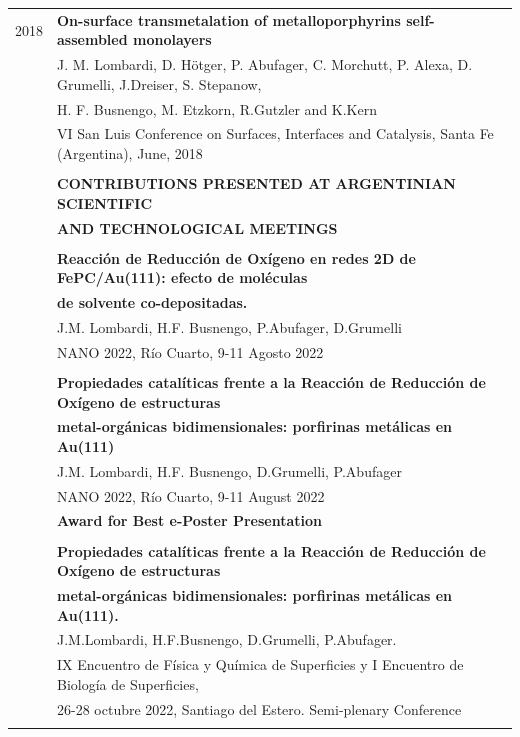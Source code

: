\documentclass[11pt]{article}
\newcommand{\mediumspace}{\\[-3pt]}
\newcommand{\smallspace}{\\[-5pt]}
\newcommand{\titlefont}[1]{\uppercase{\textbf{\Large{#1}}}}
\begin{document}
\begin{tcbposter}[
    poster = {columns=1, rows=1, spacing=0pt},
    boxes = {sharp corners, halign=center, valign=center, boxrule=0pt}
]
{\begin{tabular}{>{\footnotesize}rl}
        2018
            & \textbf{On-surface transmetalation of metalloporphyrins self-assembled monolayers} \\
            & J. M. Lombardi, D. Hötger, P. Abufager, C. Morchutt, P. Alexa, D. Grumelli, J.Dreiser, S. Stepanow,\\
            & H. F. Busnengo, M. Etzkorn, R.Gutzler and K.Kern \\
            & VI San Luis Conference on Surfaces, Interfaces and Catalysis, Santa Fe (Argentina), June, 2018 \\
            & \smallspace
            
        & \titlefont{Contributions presented at Argentinian scientific} \\ 
        & \titlefont{and technological meetings} \\
        \hline \mediumspace

        & \textbf{Reacción de Reducción de Oxígeno en redes 2D de FePC/Au(111): efecto de moléculas} \\ 
        & \textbf{de solvente co-depositadas.} \\ 
        & J.M. Lombardi, H.F. Busnengo, P.Abufager, D.Grumelli \\
        & NANO 2022, Río Cuarto, 9-11 Agosto 2022 \\
        & \smallspace

        & \textbf{Propiedades catalíticas frente a la Reacción de Reducción de Oxígeno de estructuras} \\
        & \textbf{metal-orgánicas bidimensionales: porfirinas metálicas en Au(111)}\\ 
        & J.M. Lombardi, H.F. Busnengo, D.Grumelli, P.Abufager \\
        & NANO 2022, Río Cuarto, 9-11 August 2022 \\
        & \textcolor{hl0}{\textbf{Award for Best e-Poster Presentation}} \\
        & \smallspace

        & \textbf{Propiedades catalíticas frente a la Reacción de Reducción de Oxígeno de estructuras} \\
        & \textbf{metal-orgánicas bidimensionales: porfirinas metálicas en Au(111).} \\
        & J.M.Lombardi, H.F.Busnengo, D.Grumelli, P.Abufager. \\
        & IX Encuentro de Física y Química de Superficies y I Encuentro de Biología de Superficies, \\
        & 26-28 octubre 2022, Santiago del Estero. Semi-plenary Conference \\
        & \smallspace


\end{tabular}}
\end{tcbposter}
\end{document}
